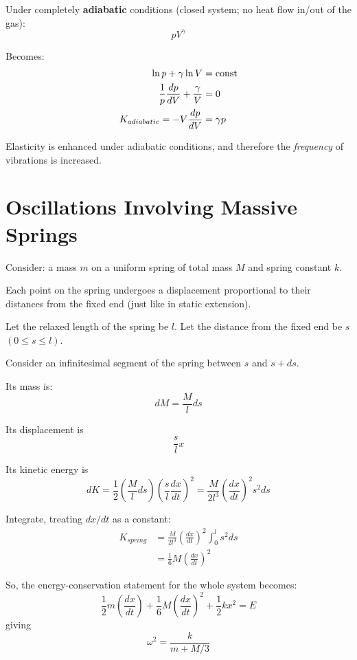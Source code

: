 \documentclass[11pt,letterpaper,titlepage,oneside]{book}
\begin{document}
Under completely \textbf{adiabatic} conditions (closed system; no heat flow in/out of the gas):
\begin{equation} pV^\gamma \end{equation}

Becomes:
\begin{align}
\ln p + \gamma\ln V &= \text{const} \notag \\
\frac{1}{p}\frac{dp}{dV} + \frac{\gamma}{V} &= 0 \notag \\
K_{adiabatic} = -V \frac{dp}{dV} &= \gamma p \label{Kadiabatic}
\end{align}

Elasticity is enhanced under adiabatic conditions, and therefore the \textit{frequency} of vibrations is increased.

\section{Oscillations Involving Massive Springs} \label{ch3:sec-massive-springs}
Consider: a mass $m$ on a uniform spring of total mass $M$ and spring constant $k$.

Each point on the spring undergoes a displacement proportional to their distances from the fixed end (just like in static extension).

Let the relaxed length of the spring be $l$. Let the distance from the fixed end be $s$ $(0 \leq s \leq l)$. 

Consider an infinitesimal segment of the spring between $s$ and $s + ds$.

Its mass is: \[ dM = \frac{M}{l} ds \] 

Its displacement is \[ \frac{s}{l} x \]

Its kinetic energy is \[ dK = \frac{1}{2}\left( \frac{M}{l} ds \right) \left( \frac{s}{l} \frac{dx}{dt} \right)^2 = \frac{M}{2l^3} \left( \frac{dx}{dt} \right)^2 s^2 ds \]

Integrate, treating $dx/dt$ as a constant:
\begin{align*}
K_{spring} &= \frac{M}{2l^3} \left( \frac{dx}{dt} \right)^2  \int_0^{l} s^2 ds \\
&= \frac{1}{6}M\left(\frac{dx}{dt}\right)^2
\end{align*}

So, the energy-conservation statement for the whole system becomes:
\[ \frac{1}{2}m\left(\frac{dx}{dt}\right) + \frac{1}{6}M\left( \frac{dx}{dt}\right)^2 + \frac{1}{2}kx^2 = E \]
giving
\[ \omega^2 = \frac{k}{m + M/3} \]
\end{document}
